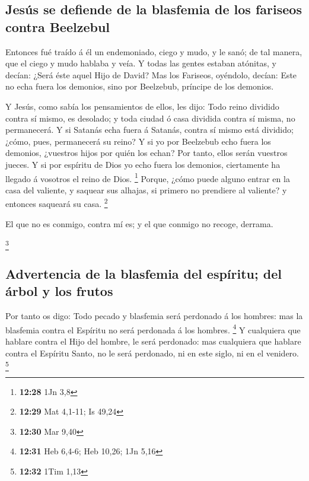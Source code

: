 \hypertarget{jesuxfas-se-defiende-de-la-blasfemia-de-los-fariseos-contra-beelzebul}{%
\subsection{Jesús se defiende de la blasfemia de los fariseos contra
Beelzebul}\label{jesuxfas-se-defiende-de-la-blasfemia-de-los-fariseos-contra-beelzebul}}

 Entonces fué traído á él un endemoniado, ciego y mudo, y
le sanó; de tal manera, que el ciego y mudo hablaba y veía.
 Y todas las gentes estaban atónitas, y decían: ¿Será
éste aquel Hijo de David?  Mas los Fariseos, oyéndolo,
decían: Este no echa fuera los demonios, sino por Beelzebub, príncipe de
los demonios.

 Y Jesús, como sabía los pensamientos de ellos, les dijo:
Todo reino dividido contra sí mismo, es desolado; y toda ciudad ó casa
dividida contra sí misma, no permanecerá.  Y si Satanás
echa fuera á Satanás, contra sí mismo está dividido; ¿cómo, pues,
permanecerá su reino?  Y si yo por Beelzebub echo fuera
los demonios, ¿vuestros hijos por quién los echan? Por tanto, ellos
serán vuestros jueces.  Y si por espíritu de Dios yo echo
fuera los demonios, ciertamente ha llegado á vosotros el reino de Dios.
\footnote{\textbf{12:28} 1Jn 3,8}  Porque, ¿cómo puede
alguno entrar en la casa del valiente, y saquear sus alhajas, si primero
no prendiere al valiente? y entonces saqueará su casa. \footnote{\textbf{12:29}
  Mat 4,1-11; Is 49,24}

 El que no es conmigo, contra mí es; y el que conmigo no
recoge, derrama.

\footnote{\textbf{12:30} Mar 9,40}

\hypertarget{advertencia-de-la-blasfemia-del-espuxedritu-del-uxe1rbol-y-los-frutos}{%
\subsection{Advertencia de la blasfemia del espíritu; del árbol y los
frutos}\label{advertencia-de-la-blasfemia-del-espuxedritu-del-uxe1rbol-y-los-frutos}}

 Por tanto os digo: Todo pecado y blasfemia será
perdonado á los hombres: mas la blasfemia contra el Espíritu no será
perdonada á los hombres. \footnote{\textbf{12:31} Heb 6,4-6; Heb 10,26;
  1Jn 5,16}  Y cualquiera que hablare contra el Hijo del
hombre, le será perdonado: mas cualquiera que hablare contra el Espíritu
Santo, no le será perdonado, ni en este siglo, ni en el venidero.
\footnote{\textbf{12:32} 1Tim 1,13}

